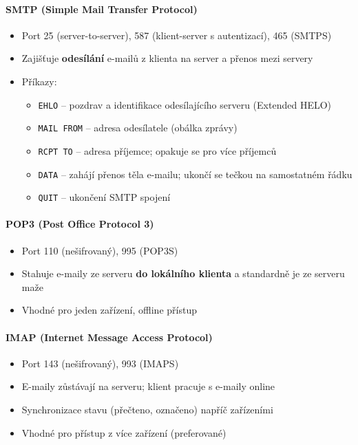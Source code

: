 \paragraph{SMTP (Simple Mail Transfer Protocol)}
\begin{itemize}
  \item Port 25 (server-to-server), 587 (klient-server s autentizací), 465 (SMTPS)
  \item Zajišťuje \textbf{odesílání} e-mailů z klienta na server a přenos mezi servery
  \item Příkazy:
    \begin{itemize}
      \item \texttt{EHLO} -- pozdrav a identifikace odesílajícího serveru (Extended HELO)
      \item \texttt{MAIL FROM} -- adresa odesílatele (obálka zprávy)
      \item \texttt{RCPT TO} -- adresa příjemce; opakuje se pro více příjemců
      \item \texttt{DATA} -- zahájí přenos těla e-mailu; ukončí se tečkou na samostatném řádku
      \item \texttt{QUIT} -- ukončení SMTP spojení
    \end{itemize}
\end{itemize}

\paragraph{POP3 (Post Office Protocol 3)}
\begin{itemize}
  \item Port 110 (nešifrovaný), 995 (POP3S)
  \item Stahuje e-maily ze serveru \textbf{do lokálního klienta} a standardně je ze serveru maže
  \item Vhodné pro jeden zařízení, offline přístup
\end{itemize}

\paragraph{IMAP (Internet Message Access Protocol)}
\begin{itemize}
  \item Port 143 (nešifrovaný), 993 (IMAPS)
  \item E-maily zůstávají na serveru; klient pracuje s e-maily online
  \item Synchronizace stavu (přečteno, označeno) napříč zařízeními
  \item Vhodné pro přístup z více zařízení (preferované)
\end{itemize}

